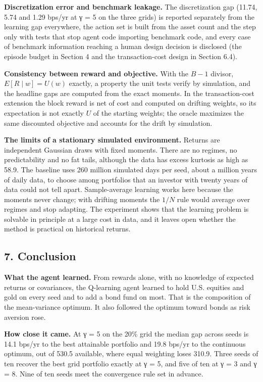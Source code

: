 \documentclass[
  11pt]{article}
\begin{document}
\textbf{Discretization error and benchmark leakage.} The discretization
gap (11.74, 5.74 and 1.29 bps/yr at γ = 5 on the three grids) is
reported separately from the learning gap everywhere, the action set is
built from the asset count and the step only with tests that stop agent
code importing benchmark code, and every case of benchmark information
reaching a human design decision is disclosed (the episode budget in
Section 4 and the transaction-cost design in Section 6.4).

\textbf{Consistency between reward and objective.} With the \(B-1\)
divisor, \(E[R \mid w] = U(w)\) exactly, a property the unit tests
verify by simulation, and the headline gaps are computed from the exact
moments. In the transaction-cost extension the block reward is net of
cost and computed on drifting weights, so its expectation is not exactly
\(U\) of the starting weights; the oracle maximizes the same discounted
objective and accounts for the drift by simulation.

\textbf{The limits of a stationary simulated environment.} Returns are
independent Gaussian draws with fixed moments. There are no regimes, no
predictability and no fat tails, although the data has excess kurtosis
as high as 58.9. The baseline uses 260 million simulated days per seed,
about a million years of daily data, to choose among portfolios that an
investor with twenty years of data could not tell apart. Sample-average
learning works here because the moments never change; with drifting
moments the \(1/N\) rule would average over regimes and stop adapting.
The experiment shows that the learning problem is solvable in principle
at a large cost in data, and it leaves open whether the method is
practical on historical returns.

\subsection{7. Conclusion}\label{conclusion}

\textbf{What the agent learned.} From rewards alone, with no knowledge
of expected returns or covariances, the Q-learning agent learned to hold
U.S. equities and gold on every seed and to add a bond fund on most.
That is the composition of the mean-variance optimum. It also followed
the optimum toward bonds as risk aversion rose.

\textbf{How close it came.} At γ = 5 on the 20\% grid the median gap
across seeds is 14.1 bps/yr to the best attainable portfolio and 19.8
bps/yr to the continuous optimum, out of 530.5 available, where equal
weighting loses 310.9. Three seeds of ten recover the best grid
portfolio exactly at γ = 5, and five of ten at γ = 3 and γ = 8. Nine of
ten seeds meet the convergence rule set in advance.
\end{document}
